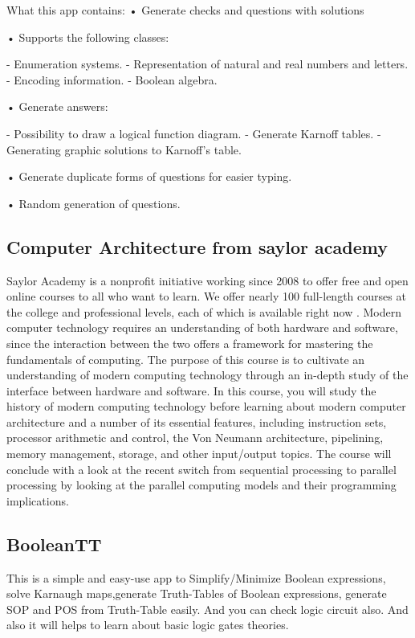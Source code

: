  What this app contains:
 • Generate checks and questions with solutions
 
 • Supports the following classes:
 
 - Enumeration systems.
 - Representation of natural and real numbers and letters.
 - Encoding information.
 - Boolean algebra.
 
 • Generate answers:
 
 - Possibility to draw a logical function diagram.
 - Generate Karnoff tables.
 - Generating graphic solutions to Karnoff's table.
 
 • Generate duplicate forms of questions for easier typing.
 
 • Random generation of questions.
 
 \subsection{Computer Architecture from saylor academy}
 Saylor Academy is a nonprofit initiative working since 2008 to offer free and open online courses to all who want to learn.
  We offer nearly 100 full-length courses at the college and professional levels, each of which is available right now .
 Modern computer technology requires an understanding of both hardware and software, since the interaction between the two 
 offers a framework for mastering the fundamentals of computing. The purpose of this course is to cultivate an understanding 
 of modern computing technology through an in-depth study of the interface between hardware and software. In this course,
  you will study the history of modern computing technology before learning about modern computer architecture and a number
   of its essential features, including instruction sets, processor arithmetic and control, the Von Neumann architecture, 
   pipelining, memory management, storage, and other input/output topics. The course will conclude with a look at the recent 
   switch from sequential processing to parallel processing by looking at the parallel computing models and their programming 
   implications.\cite{Computer-Architecture-saylor-academy}
 
 
 
 \subsection{BooleanTT}
 This is a simple and easy-use app to Simplify/Minimize Boolean expressions, solve Karnaugh maps,generate Truth-Tables of Boolean expressions, generate SOP and POS from Truth-Table easily. And you can check logic circuit also.
 And also it will helps to learn about basic logic gates theories.
 
